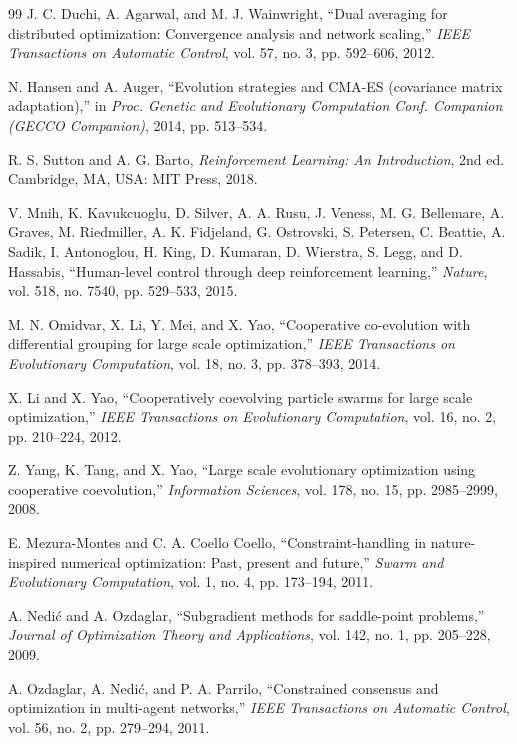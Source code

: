 \documentclass[conference]{IEEEtran}
\begin{document}
\begin{thebibliography}{99}
 J. C. Duchi, A. Agarwal, and M. J. Wainwright, ``Dual averaging for distributed optimization: Convergence analysis and network scaling,'' \emph{IEEE Transactions on Automatic Control}, vol. 57, no. 3, pp. 592--606, 2012.

 N. Hansen and A. Auger, ``Evolution strategies and CMA-ES (covariance matrix adaptation),'' in \emph{Proc. Genetic and Evolutionary Computation Conf. Companion (GECCO Companion)}, 2014, pp. 513--534.

 R. S. Sutton and A. G. Barto, \emph{Reinforcement Learning: An Introduction}, 2nd ed. Cambridge, MA, USA: MIT Press, 2018.

 V. Mnih, K. Kavukcuoglu, D. Silver, A. A. Rusu, J. Veness, M. G. Bellemare, A. Graves, M. Riedmiller, A. K. Fidjeland, G. Ostrovski, S. Petersen, C. Beattie, A. Sadik, I. Antonoglou, H. King, D. Kumaran, D. Wierstra, S. Legg, and D. Hassabis, ``Human-level control through deep reinforcement learning,'' \emph{Nature}, vol. 518, no. 7540, pp. 529--533, 2015.

 M. N. Omidvar, X. Li, Y. Mei, and X. Yao, ``Cooperative co-evolution with differential grouping for large scale optimization,'' \emph{IEEE Transactions on Evolutionary Computation}, vol. 18, no. 3, pp. 378--393, 2014.

 X. Li and X. Yao, ``Cooperatively coevolving particle swarms for large scale optimization,'' \emph{IEEE Transactions on Evolutionary Computation}, vol. 16, no. 2, pp. 210--224, 2012.

 Z. Yang, K. Tang, and X. Yao, ``Large scale evolutionary optimization using cooperative coevolution,'' \emph{Information Sciences}, vol. 178, no. 15, pp. 2985--2999, 2008.

 E. Mezura-Montes and C. A. Coello Coello, ``Constraint-handling in nature-inspired numerical optimization: Past, present and future,'' \emph{Swarm and Evolutionary Computation}, vol. 1, no. 4, pp. 173--194, 2011.

 A. Nedi\'c and A. Ozdaglar, ``Subgradient methods for saddle-point problems,'' \emph{Journal of Optimization Theory and Applications}, vol. 142, no. 1, pp. 205--228, 2009.

 A. Ozdaglar, A. Nedi\'c, and P. A. Parrilo, ``Constrained consensus and optimization in multi-agent networks,'' \emph{IEEE Transactions on Automatic Control}, vol. 56, no. 2, pp. 279--294, 2011.


\end{thebibliography}
\end{document}
